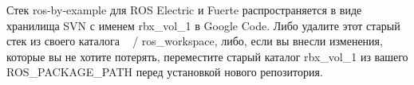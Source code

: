 

Стек ros-by-example для ROS Electric и Fuerte распространяется в виде хранилища SVN с именем rbx\_vol\_1 в Google Code. Либо удалите этот старый стек из своего каталога ~ / ros\_workspace, либо, если вы внесли изменения, которые вы не хотите потерять, переместите старый каталог rbx\_vol\_1 из вашего ROS\_PACKAGE\_PATH перед установкой нового репозитория. 

